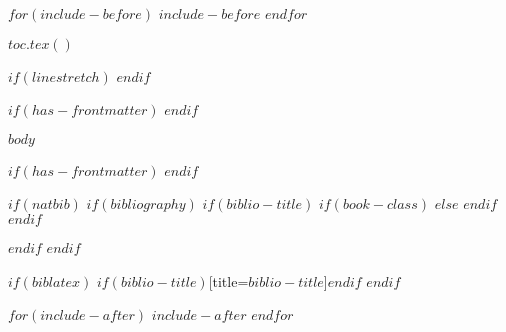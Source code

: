 \providecommand{\tightlist}{\setlength{\itemsep}{0pt}\setlength{\parskip}{0pt}}



$for(include-before)$
$include-before$
$endfor$

$toc.tex()$

$if(linestretch)$
$endif$

$if(has-frontmatter)$
\mainmatter
$endif$

$body$

$if(has-frontmatter)$
\backmatter
$endif$

$if(natbib)$
$if(bibliography)$
$if(biblio-title)$
$if(book-class)$
\renewcommand\bibname{$biblio-title$}
$else$
\renewcommand\refname{$biblio-title$}
$endif$
$endif$

$endif$
$endif$

$if(biblatex)$
\printbibliography$if(biblio-title)$[title=$biblio-title$]$endif$
$endif$

$for(include-after)$
$include-after$
$endfor$

